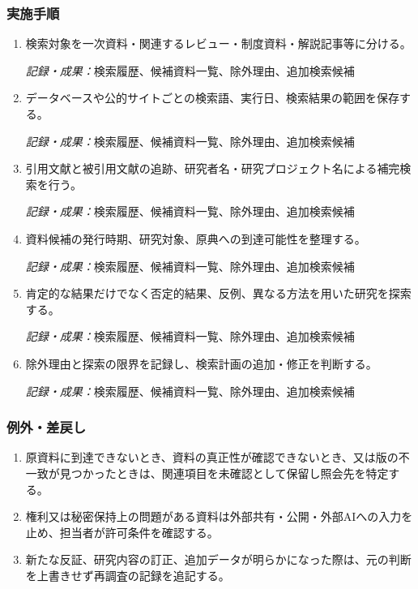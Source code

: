\documentclass[a4paper,11pt]{article}
\begin{document}
\subsubsection*{実施手順}
\begin{enumerate}[leftmargin=2em,itemsep=0.65em]
\item 検索対象を一次資料・関連するレビュー・制度資料・解説記事等に分ける。\par\noindent\textit{記録・成果：}検索履歴、候補資料一覧、除外理由、追加検索候補\nobreak\smallskip
\item データベースや公的サイトごとの検索語、実行日、検索結果の範囲を保存する。\par\noindent\textit{記録・成果：}検索履歴、候補資料一覧、除外理由、追加検索候補\nobreak\smallskip
\item 引用文献と被引用文献の追跡、研究者名・研究プロジェクト名による補完検索を行う。\par\noindent\textit{記録・成果：}検索履歴、候補資料一覧、除外理由、追加検索候補\nobreak\smallskip
\item 資料候補の発行時期、研究対象、原典への到達可能性を整理する。\par\noindent\textit{記録・成果：}検索履歴、候補資料一覧、除外理由、追加検索候補\nobreak\smallskip
\item 肯定的な結果だけでなく否定的結果、反例、異なる方法を用いた研究を探索する。\par\noindent\textit{記録・成果：}検索履歴、候補資料一覧、除外理由、追加検索候補\nobreak\smallskip
\item 除外理由と探索の限界を記録し、検索計画の追加・修正を判断する。\par\noindent\textit{記録・成果：}検索履歴、候補資料一覧、除外理由、追加検索候補\nobreak\smallskip
\end{enumerate}
\subsubsection*{例外・差戻し}
\begin{enumerate}[leftmargin=2em,itemsep=0.35em]
\item 原資料に到達できないとき、資料の真正性が確認できないとき、又は版の不一致が見つかったときは、関連項目を未確認として保留し照会先を特定する。
\item 権利又は秘密保持上の問題がある資料は外部共有・公開・外部AIへの入力を止め、担当者が許可条件を確認する。
\item 新たな反証、研究内容の訂正、追加データが明らかになった際は、元の判断を上書きせず再調査の記録を追記する。
\end{enumerate}
\end{document}
